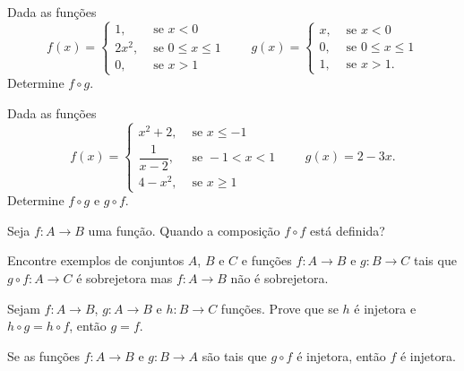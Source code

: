 \documentclass[12pt]{exam}
\begin{document}
    \questao{} Dada as fun\c{c}\~oes
    \[
        f(x) = \begin{cases}
            1, & \mbox{ se } x < 0\\
            2x^2, & \mbox{ se } 0 \le x \le 1\\
            0, & \mbox{ se } x > 1
        \end{cases} \qquad g(x) = \begin{cases}
            x, & \mbox{ se } x < 0\\
            0, & \mbox{ se } 0 \le x \le 1\\
            1, & \mbox{ se } x > 1.
        \end{cases}
    \]
    Determine $f\circ g$.

    \vspace{.3cm}

    \questao{} Dada as fun\c{c}\~oes
    \[
        f(x) = \begin{cases}
            x^2 + 2, & \mbox{ se } x \le -1\\
            \dfrac{1}{x - 2}, & \mbox{ se } -1 < x < 1\\
            4 - x^2, & \mbox{ se } x \ge 1
        \end{cases} \qquad g(x) = 2 - 3x.
    \]
    Determine $f\circ g$ e $g \circ f$.

    \vspace{.3cm}

    \questao{} Seja $f : A \to B$ uma função. Quando a composição $f \circ f$ está definida?

    \vspace{.3cm}

    \questao{} Encontre exemplos de conjuntos $A$, $B$ e $C$ e funções $f : A \to B$ e $g : B \to C$ tais que $g \circ f : A \to C$ é sobrejetora mas $f : A \to B$ não é sobrejetora.

    \vspace{.3cm}

    \questao{} Sejam $f : A \to B$, $g : A \to B$ e $h : B \to C$ fun\c{c}\~oes. Prove que se $h$ \'e injetora e $h \circ g = h \circ f$, ent\~ao $g = f$.

    \vspace{.3cm}

    \questao{} Se as fun{\c c}{\~o}es $f : A \to B$ e $g : B\to A$ s{\~a}o
    tais que $g\circ f$ {\'e} injetora, ent{\~a}o $f$ {\'e} injetora.

    \vspace{.3cm}
\end{document}
